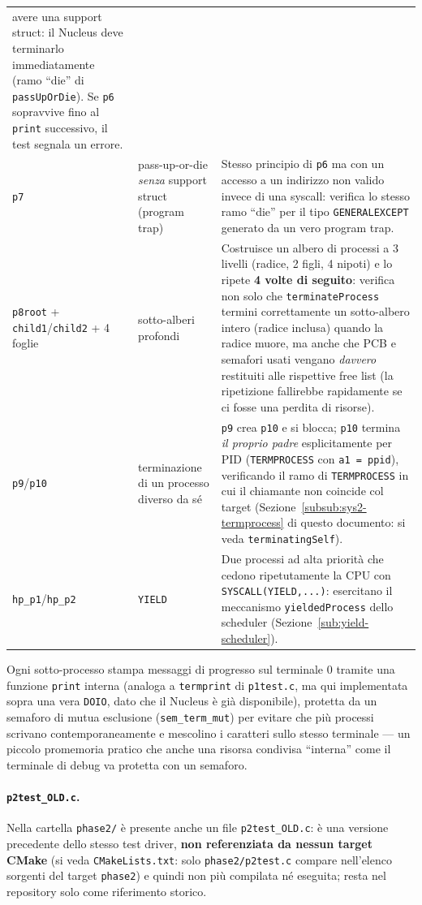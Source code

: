 \documentclass[11pt,a4paper]{article}
\newcommand{\code}[1]{\texttt{#1}}
\begin{document}
\begin{center}
\begin{longtable}{@{}llp{8.6cm}@{}}
  avere una support struct: il Nucleus deve terminarlo immediatamente
  (ramo ``die'' di \code{passUpOrDie}). Se \code{p6} sopravvive fino al
  \code{print} successivo, il test segnala un errore. \\
\code{p7} & pass-up-or-die \emph{senza} support struct (program trap) &
  Stesso principio di \code{p6} ma con un accesso a un indirizzo non
  valido invece di una syscall: verifica lo stesso ramo ``die'' per il tipo
  \code{GENERALEXCEPT} generato da un vero program trap. \\
\code{p8root} + \code{child1}/\code{child2} + 4 foglie & sotto-alberi
  profondi & Costruisce un albero di processi a 3 livelli (radice, 2 figli,
  4 nipoti) e lo ripete \textbf{4 volte di seguito}: verifica non solo che
  \code{terminateProcess} termini correttamente un sotto-albero intero
  (radice inclusa) quando la radice muore, ma anche che PCB e semafori
  usati vengano \emph{davvero} restituiti alle rispettive free list (la
  ripetizione fallirebbe rapidamente se ci fosse una perdita di risorse). \\
\code{p9}/\code{p10} & terminazione di un processo diverso da sé & \code{p9}
  crea \code{p10} e si blocca; \code{p10} termina \emph{il proprio padre}
  esplicitamente per PID (\code{TERMPROCESS} con \code{a1 = ppid}),
  verificando il ramo di \code{TERMPROCESS} in cui il chiamante non
  coincide col target (Sezione~\ref{subsub:sys2-termprocess} di questo
  documento: si veda \code{terminatingSelf}). \\
\code{hp\_p1}/\code{hp\_p2} & \code{YIELD} & Due processi ad alta priorità
  che cedono ripetutamente la CPU con \code{SYSCALL(YIELD,...)}: esercitano
  il meccanismo \code{yieldedProcess} dello scheduler
  (Sezione~\ref{sub:yield-scheduler}). \\
\bottomrule
\end{longtable}
\end{center}

Ogni sotto-processo stampa messaggi di progresso sul terminale 0 tramite una
funzione \code{print} interna (analoga a \code{termprint} di
\code{p1test.c}, ma qui implementata sopra una vera \code{DOIO}, dato che il
Nucleus è già disponibile), protetta da un semaforo di mutua esclusione
(\code{sem\_term\_mut}) per evitare che più processi scrivano
contemporaneamente e mescolino i caratteri sullo stesso terminale --- un
piccolo promemoria pratico che anche una risorsa condivisa ``interna'' come
il terminale di debug va protetta con un semaforo.

\paragraph{\code{p2test\_OLD.c}.} Nella cartella \code{phase2/} è presente
anche un file \code{p2test\_OLD.c}: è una versione precedente dello stesso
test driver, \textbf{non referenziata da nessun target CMake} (si veda
\code{CMakeLists.txt}: solo \code{phase2/p2test.c} compare nell'elenco
sorgenti del target \code{phase2}) e quindi non più compilata né eseguita;
resta nel repository solo come riferimento storico.
\end{document}
